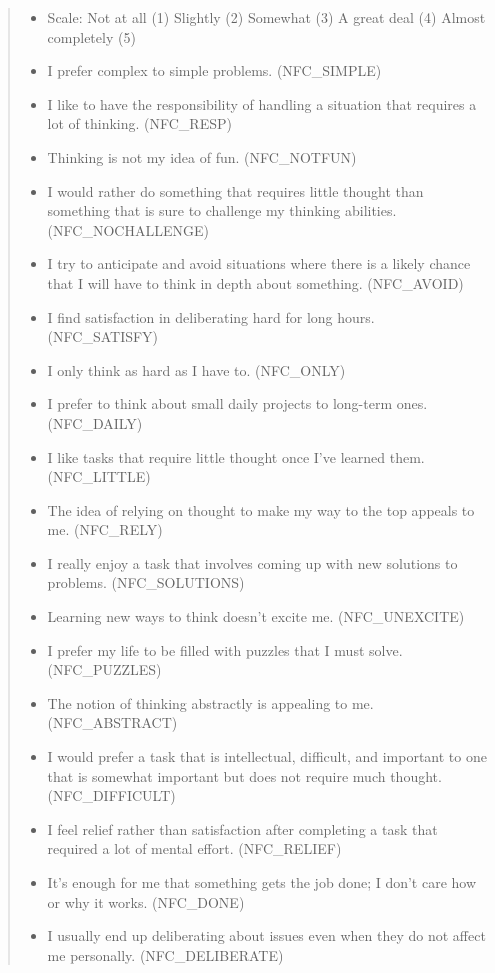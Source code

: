 \documentclass[
]{book}
\providecommand{\tightlist}{%
  \setlength{\itemsep}{0pt}\setlength{\parskip}{0pt}}
\begin{document}
\begin{quote}
\begin{itemize}
\tightlist
\item
  Scale: Not at all (1) Slightly (2) Somewhat (3) A great deal (4) Almost completely (5)
\item
  I prefer complex to simple problems. (NFC\_SIMPLE)
\item
  I like to have the responsibility of handling a situation that requires a lot of thinking. (NFC\_RESP)
\item
  Thinking is not my idea of fun. (NFC\_NOTFUN)
\item
  I would rather do something that requires little thought than something that is sure to challenge my thinking abilities. (NFC\_NOCHALLENGE)
\item
  I try to anticipate and avoid situations where there is a likely chance that I will have to think in depth about something. (NFC\_AVOID)
\item
  I find satisfaction in deliberating hard for long hours. (NFC\_SATISFY)
\item
  I only think as hard as I have to. (NFC\_ONLY)
\item
  I prefer to think about small daily projects to long-term ones. (NFC\_DAILY)
\item
  I like tasks that require little thought once I've learned them. (NFC\_LITTLE)
\item
  The idea of relying on thought to make my way to the top appeals to me. (NFC\_RELY)
\item
  I really enjoy a task that involves coming up with new solutions to problems. (NFC\_SOLUTIONS)
\item
  Learning new ways to think doesn't excite me. (NFC\_UNEXCITE)
\item
  I prefer my life to be filled with puzzles that I must solve. (NFC\_PUZZLES)
\item
  The notion of thinking abstractly is appealing to me. (NFC\_ABSTRACT)
\item
  I would prefer a task that is intellectual, difficult, and important to one that is somewhat important but does not require much thought. (NFC\_DIFFICULT)
\item
  I feel relief rather than satisfaction after completing a task that required a lot of mental effort. (NFC\_RELIEF)
\item
  It's enough for me that something gets the job done; I don't care how or why it works. (NFC\_DONE)
\item
  I usually end up deliberating about issues even when they do not affect me personally. (NFC\_DELIBERATE)
\end{itemize}
\end{quote}
\end{document}
